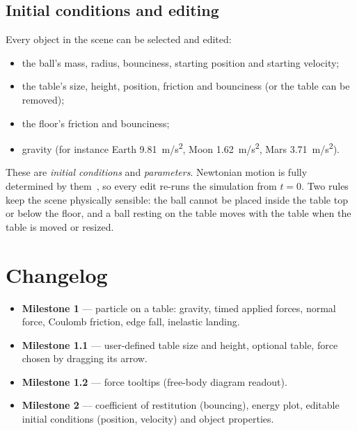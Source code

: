 \documentclass[11pt]{article}
\begin{document}
\subsection{Initial conditions and editing}
Every object in the scene can be selected and edited:
\begin{itemize}
  \item the ball's mass, radius, bounciness, starting position and starting velocity;
  \item the table's size, height, position, friction and bounciness (or the table can be removed);
  \item the floor's friction and bounciness;
  \item gravity (for instance Earth \SI{9.81}{m/s^2}, Moon \SI{1.62}{m/s^2}, Mars \SI{3.71}{m/s^2}).
\end{itemize}
These are \emph{initial conditions} and \emph{parameters}. Newtonian motion is fully determined by them~\cite{taylor2005},
so every edit re-runs the simulation from $t=0$. Two rules keep the scene physically sensible: the ball cannot be placed inside
the table top or below the floor, and a ball resting on the table moves with the table when the table is moved or resized.

\section*{Changelog}
\begin{itemize}
  \item \textbf{Milestone 1} --- particle on a table: gravity, timed applied forces, normal force,
        Coulomb friction, edge fall, inelastic landing.
  \item \textbf{Milestone 1.1} --- user-defined table size and height, optional table, force
        chosen by dragging its arrow.
  \item \textbf{Milestone 1.2} --- force tooltips (free-body diagram readout).
  \item \textbf{Milestone 2} --- coefficient of restitution (bouncing), energy plot, editable initial
        conditions (position, velocity) and object properties.
\end{itemize}

\printbibliography
\end{document}
